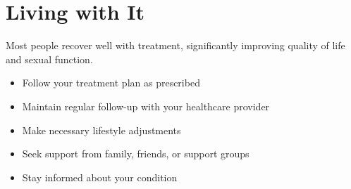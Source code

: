 \section{Living with It}
Most people recover well with treatment, significantly improving quality of life and sexual function.

\begin{itemize}[noitemsep]
  \item Follow your treatment plan as prescribed
  \item Maintain regular follow-up with your healthcare provider
  \item Make necessary lifestyle adjustments
  \item Seek support from family, friends, or support groups
  \item Stay informed about your condition
\end{itemize}
